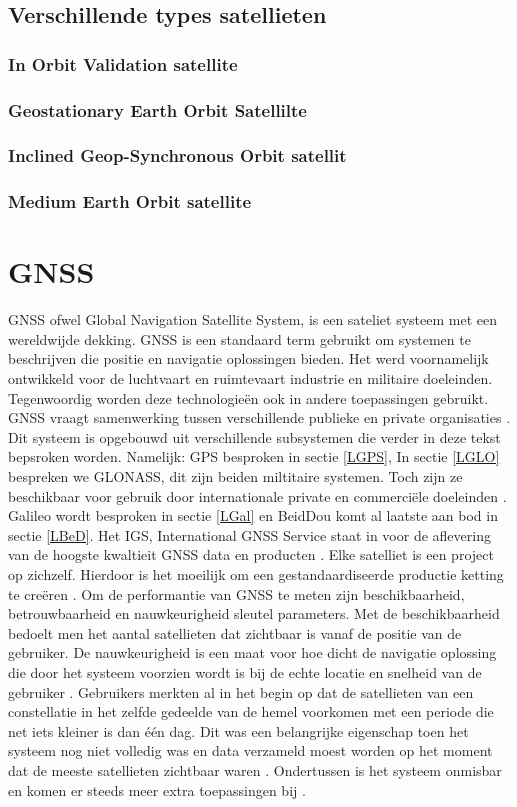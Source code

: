 \subsection{Verschillende types satellieten}
\label{LVTS}
\subsubsection{In Orbit Validation satellite}
\subsubsection{Geostationary Earth Orbit Satellilte}
\subsubsection{Inclined Geop-Synchronous Orbit satellit}
\subsubsection{Medium Earth Orbit satellite}

\section{GNSS}
\label{LGNS}
GNSS ofwel Global Navigation Satellite System, is een sateliet systeem met een wereldwijde dekking. GNSS is een standaard term gebruikt om systemen te beschrijven die positie en navigatie oplossingen bieden. Het werd voornamelijk ontwikkeld voor de luchtvaart en ruimtevaart industrie en militaire doeleinden. Tegenwoordig worden deze technologie\"en ook in andere toepassingen gebruikt. GNSS vraagt samenwerking tussen verschillende publieke en private organisaties \cite{LBibGNSS3}.  Dit systeem is opgebouwd uit verschillende subsystemen die verder in deze tekst bepsroken worden. Namelijk: GPS besproken in sectie \ref{LGPS}, In sectie \ref{LGLO} bespreken we GLONASS, dit zijn beiden miltitaire systemen. Toch zijn ze beschikbaar voor gebruik door internationale private en commerci\"ele doeleinden \cite{LBibGNSS8}. Galileo wordt besproken in sectie \ref{LGal} en BeidDou komt al laatste aan bod in sectie \ref{LBeD}. Het IGS, International GNSS Service staat in voor de aflevering van de hoogste kwaltieit GNSS data en producten \cite{LBibGNSS}. Elke satelliet is een project op zichzelf. Hierdoor is het moeilijk om een gestandaardiseerde productie ketting te creëren \cite{LBibGNSS3}. Om de performantie van GNSS te meten zijn beschikbaarheid, betrouwbaarheid en nauwkeurigheid sleutel parameters. Met de beschikbaarheid bedoelt men het aantal satellieten dat zichtbaar is vanaf de positie van de gebruiker. De nauwkeurigheid is een maat voor hoe dicht de navigatie oplossing die door het systeem voorzien wordt is bij de echte locatie en snelheid van de gebruiker \cite{LBibGNSS6}. Gebruikers merkten al in het begin op dat de satellieten van een constellatie in het zelfde gedeelde van de hemel voorkomen met een periode die net iets kleiner is dan \'e\'en dag. Dit was een belangrijke eigenschap toen het systeem nog niet volledig was en data verzameld moest worden op het moment dat de meeste satellieten zichtbaar waren \cite{LBibGNSS7}. Ondertussen is het systeem onmisbar en komen er steeds meer extra toepassingen bij \cite{LBibGNSS8}.

